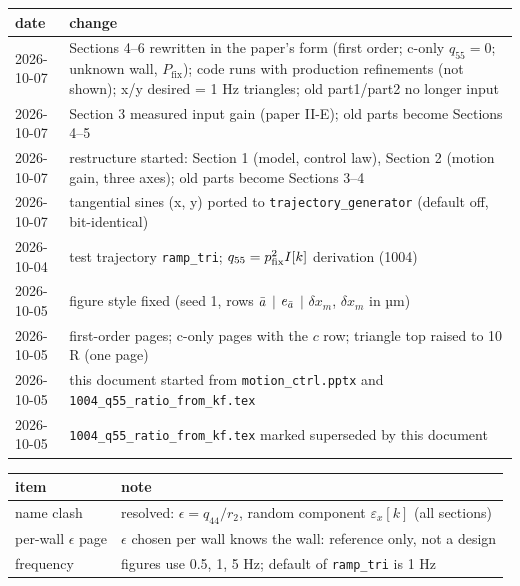 \smallskip
{\small
\begin{tabular}{@{}ll@{}}
\toprule
date & change \\
\midrule
2026-10-07 & Sections 4--6 rewritten in the paper's form (first order; c-only $q_{55}=0$; unknown wall, $P_{\mathrm{fix}}$); code runs with production refinements (not shown); x/y desired = 1 Hz triangles; old part1/part2 no longer input \\
2026-10-07 & Section 3 measured input gain (paper II-E); old parts become Sections 4--5 \\
2026-10-07 & restructure started: Section 1 (model, control law), Section 2 (motion gain, three axes); old parts become Sections 3--4 \\
2026-10-07 & tangential sines (x, y) ported to \texttt{trajectory\_generator} (default off, bit-identical) \\
2026-10-04 & test trajectory \texttt{ramp\_tri}; $q_{55} = p_{\mathrm{fix}}^{2} I[k]$ derivation (1004) \\
2026-10-05 & figure style fixed (seed 1, rows $\bar{a}$ $|$ $e_{\bar{a}}$ $|$ $\delta x_m$, $\delta x_m$ in µm) \\
2026-10-05 & first-order pages; c-only pages with the $c$ row; triangle top raised to 10 R (one page) \\
2026-10-05 & this document started from \texttt{motion\_ctrl.pptx} and \texttt{1004\_q55\_ratio\_from\_kf.tex} \\
2026-10-05 & \texttt{1004\_q55\_ratio\_from\_kf.tex} marked superseded by this document \\
\bottomrule
\end{tabular}
}


\smallskip
{\small
\begin{tabular}{@{}ll@{}}
\toprule
item & note \\
\midrule
name clash & resolved: $\epsilon = q_{44}/r_2$, random component $\varepsilon_x[k]$ (all sections) \\
per-wall $\epsilon$ page & $\epsilon$ chosen per wall knows the wall: reference only, not a design \\
frequency & figures use 0.5, 1, 5 Hz; default of \texttt{ramp\_tri} is 1 Hz \\
\bottomrule
\end{tabular}
}
